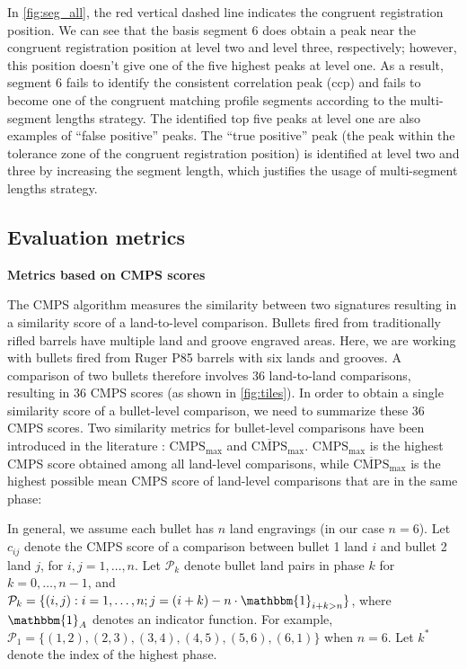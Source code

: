In \autoref{fig:seg_all}, the red vertical dashed line indicates the
congruent registration position. We can see that the basis segment 6
does obtain a peak near the congruent registration position at level two
and level three, respectively; however, this position doesn't give one
of the five highest peaks at level one. As a result, segment 6 fails to
identify the consistent correlation peak (ccp) and fails to become one
of the congruent matching profile segments according to the
multi-segment lengths strategy. The identified top five peaks at level
one are also examples of ``false positive'' peaks. The ``true positive''
peak (the peak within the tolerance zone of the congruent registration
position) is identified at level two and three by increasing the segment
length, which justifies the usage of multi-segment lengths strategy.

\hypertarget{evaluation-metrics}{%
\subsection{Evaluation metrics}\label{evaluation-metrics}}

\textbf{Metrics based on CMPS scores}

The CMPS algorithm measures the similarity between two signatures
resulting in a similarity score of a land-to-level comparison. Bullets
fired from traditionally rifled barrels have multiple land and groove
engraved areas. Here, we are working with bullets fired from Ruger P85
barrels with six lands and grooves. A comparison of two bullets
therefore involves 36 land-to-land comparisons, resulting in 36 CMPS
scores (as shown in \autoref{fig:tiles}). In order to obtain a single
similarity score of a bullet-level comparison, we need to summarize
these 36 CMPS scores. Two similarity metrics for bullet-level
comparisons have been introduced in the literature \citep{cmps}:
\(\mathrm{CMPS_{max}}\) and \(\mathrm{\overline{CMPS}_{max}}\).
\(\mathrm{CMPS_{max}}\) is the highest CMPS score obtained among all
land-level comparisons, while \(\mathrm{\overline{CMPS}_{max}}\) is the
highest possible mean CMPS score of land-level comparisons that are in
the same phase:

In general, we assume each bullet has \(n\) land engravings (in our case
\(n=6\)). Let \(c_{ij}\) denote the CMPS score of a comparison between
bullet 1 land \(i\) and bullet 2 land \(j\), for \(i,j = 1, \dots, n\).
Let \(\mathcal{P}_k\) denote bullet land pairs in phase \(k\) for
\(k = 0, \dots, n-1\), and
\(\mathcal{P}_k = \{ (i,j): i = 1, \dots, n ; j = (i + k) - n \cdot \mathbbm{1}_{i + k > n} \}\),
where \(\mathbbm{1}_A\) denotes an indicator function. For example,
\(\mathcal{P}_1 = \{ (1,2), (2,3), (3,4), (4,5), (5,6), (6,1) \}\) when
\(n = 6\). Let \(k^*\) denote the index of the highest phase.

